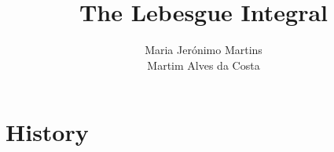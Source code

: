\documentclass[]{article}
\title{The Lebesgue Integral}
\author{Maria Jerónimo Martins \\ Martim Alves da Costa}
\theoremstyle{definition}
\theoremstyle{remark}
\begin{document}
\maketitle

\begin{abstract}

\end{abstract}

\section{History}
\end{document}
